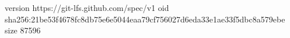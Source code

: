 version https://git-lfs.github.com/spec/v1
oid sha256:21be53f4678fc8db75e6e5044eaa79cf756027d6eda33e1ae33f5dbc8a579ebe
size 87596
